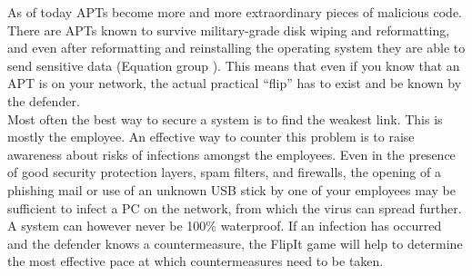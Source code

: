 As of today APTs become more and more extraordinary pieces of malicious code. There are APTs known to survive military-grade disk wiping and reformatting, and even after reformatting and reinstalling the operating system they are able to send sensitive data (Equation group \citep{Equation}). This means that even if you know that an APT is on your network, the actual practical ``flip'' has to exist and be known by the defender.  \\
Most often the best way to secure a system is to find the weakest link. This is mostly the employee. An effective way to counter this problem is to raise awareness about risks of infections amongst the employees.  Even in the presence of good security protection layers, spam filters, and firewalls, the opening of a phishing mail or use of an unknown USB stick by one of your employees may be sufficient to infect a PC on the network, from which the virus can spread further. A system can however never be 100\% waterproof.  If an infection has occurred and the defender knows a countermeasure, the FlipIt game will help to determine the most effective pace at which countermeasures need to be taken.
